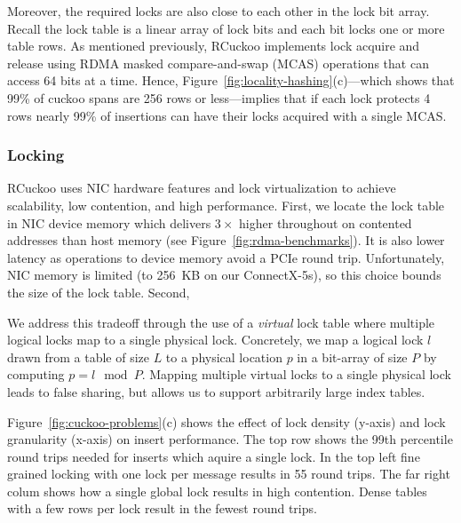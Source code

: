 Moreover, the required locks are also close to each other in the lock
bit array.  Recall the lock table is a linear array of lock bits and
each bit locks one or more table rows.  As mentioned previously,
RCuckoo implements lock acquire and release using RDMA masked
compare-and-swap (MCAS) operations that can access 64 bits at a time.
Hence, Figure~\ref{fig:locality-hashing}(c)---which shows that 99\% of
cuckoo spans are 256 rows or less---implies that if each lock protects
4 rows nearly 99\% of insertions can have their locks acquired with a
single MCAS.


\subsubsection{Locking}
\label{sec:locking}




RCuckoo uses NIC hardware features and lock
virtualization to achieve scalability, low contention, and high
performance.  First, we locate the lock table in NIC device memory
which delivers $3\times$ higher throughout on contented addresses than
host memory (see Figure~\ref{fig:rdma-benchmarks}). It is also lower
latency as operations to device memory avoid a PCIe round trip.
Unfortunately, NIC memory is limited (to 256~KB on our ConnectX-5s),
so this choice bounds the size of the lock table.  Second,


We address this tradeoff through the use of a \textit{virtual} lock
table where multiple logical locks map to a single physical lock.
Concretely, we map a logical lock $l$ drawn from a table of size $L$
to a physical location $p$ in a bit-array of size $P$ by computing $p
= l \mod P$.  Mapping multiple virtual locks to a single physical lock
leads to false sharing, but allows us to support arbitrarily large
index tables.

Figure~\ref{fig:cuckoo-problems}(c) shows the effect of lock
density (y-axis) and lock granularity (x-axis) on insert
performance. The top row shows the 99th percentile round
trips needed for inserts which aquire a single lock. In the
top left fine grained locking with one lock per message
results in 55 round trips. The far right colum shows how a
single global lock results in high contention. Dense tables
with a few rows per lock result in the fewest round trips.





